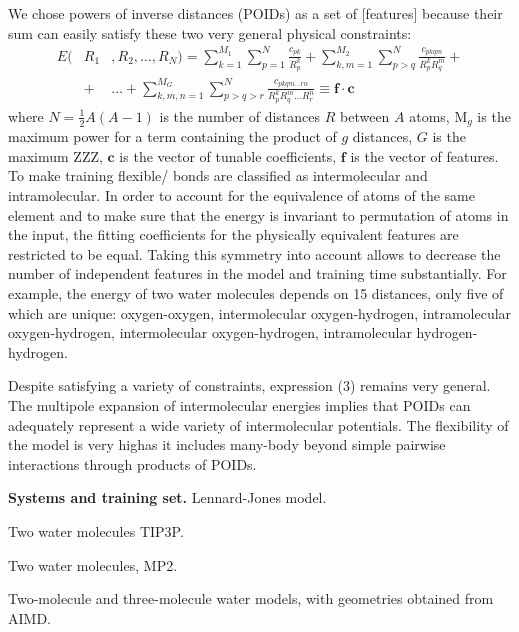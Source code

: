 \documentclass[aps,prl,reprint,amsmath,amssymb,nature]{revtex4-1}
\begin{document}
We chose powers of inverse distances (POIDs) as a set of [features] because their sum can easily satisfy these two very general physical constraints:
\begin{eqnarray}
E (&R_1&, R_2, \ldots, R_N) = \sum_{k=1}^{M_1} \sum_{p=1}^{N} \frac{c_{pk}}{R_p^k} + \sum_{k,m=1}^{M_2} \sum_{p>q}^{N} \frac{c_{pkqm}}{R_p^k R_q^m} + \nonumber \\
&+& \ldots +\sum_{k,m,n=1}^{M_G} \sum_{p>q>r}^{N} \frac{c_{pkqm\ldots rn}}{R_p^k R_q^m \ldots R_r^n} \equiv \mathbf{f}\cdot \mathbf{c}
\end{eqnarray}
%
where $N = \frac{1}{2}A(A-1)$ is the number of distances $R$ between $A$ atoms, M$_{g}$ is the maximum power for a term containing the product of $g$ distances, $G$ is the maximum ZZZ, $\mathbf{c}$ is the vector of tunable coefficients, $\mathbf{f}$ is the vector of features. 
\red To make training flexible/ bonds are classified as intermolecular and intramolecular. \old 
In order to account for the equivalence of atoms of the same element and to make sure that the energy is invariant to permutation of atoms in the input, the fitting coefficients for the physically equivalent features are restricted to be equal. 
Taking this symmetry into account allows to decrease the number of independent features in the model and training time substantially. 
For example, the energy of two water molecules depends on 15 distances, only five of which are unique: oxygen-oxygen, intermolecular oxygen-hydrogen, intramolecular oxygen-hydrogen, intermolecular oxygen-hydrogen, intramolecular hydrogen-hydrogen.

Despite satisfying a variety of constraints, expression (3) remains very general. 
The multipole expansion of intermolecular energies implies that POIDs can adequately represent a wide variety of intermolecular potentials. 
The flexibility of the model \red is very high\old as it includes many-body beyond simple pairwise interactions through products 
of POIDs.

\textbf{Systems and training set.} Lennard-Jones model.

Two water molecules TIP3P.

Two water molecules, MP2.

Two-molecule and three-molecule water models, with geometries obtained 
from AIMD.
\end{document}
